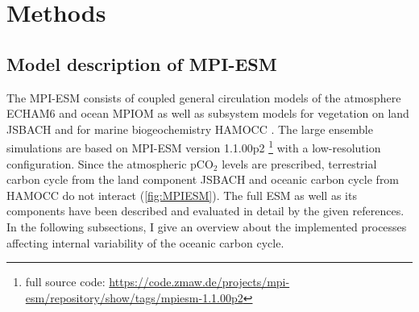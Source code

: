 \chapter{Methods}
\label{ch:methods}
\section{Model description of MPI-ESM}

The \acf{MPI-ESM} 
consists of coupled general circulation models of the atmosphere \acs{ECHAM}6 \citep{Stevens2013} and ocean \acs{MPIOM} \citep{Jungclaus2013} as well as subsystem models for vegetation on land JSBACH \citep{Reick2013} and for marine biogeochemistry \acs{HAMOCC} \citep{Ilyina2013}. The large ensemble simulations are based on \acs{MPI-ESM} version 1.1.00p2 \footnote[1]{full source code: \url{https://code.zmaw.de/projects/mpi-esm/repository/show/tags/mpiesm-1.1.00p2}} with a low-resolution configuration. Since the atmospheric pCO$_2$ levels are prescribed, terrestrial carbon cycle from the land component JSBACH and oceanic carbon cycle from \acs{HAMOCC} do not interact (\autoref{fig:MPIESM}). The full \acf{ESM} \citep{Giorgetta2013} as well as its components have been described and evaluated in detail by the given references. In the following subsections, I give an overview about the implemented processes affecting internal variability of the oceanic carbon cycle.




